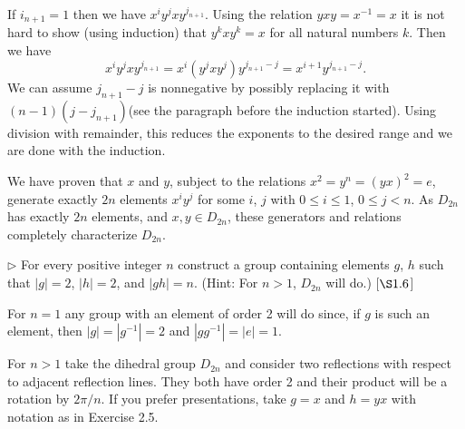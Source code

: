 \begin{solution}
	If $i_{n+1} = 1$ then we have $x^iy^jxy^{j_{n+1}}$. Using the relation $yxy = x^{-1} = x$ it is not hard to show (using induction) that $y^kxy^k = x$ for all natural numbers $k$. Then we have 
	\[
		x^iy^jxy^{j_{n+1}} = x^i(y^jxy^j)y^{j_{n+1} - j} = x^{i+1}y^{j_{n+1} - j}.
	\]
	We can assume $j_{n+1} - j$ is nonnegative by possibly replacing it with $(n-1)(j-j_{n+1})$(see the paragraph before the induction started). Using division with remainder, this reduces the exponents to the desired range and we are done with the induction.
	
	We have proven that $x$ and $y$, subject to the relations $x^2 = y^n= (yx)^2 = e$, generate exactly $2n$ elements $x^iy^j$ for some $i$, $j$ with $0 \leq i \leq 1$, $0\leq j < n$. As $D_{2n}$ has exactly $2n$ elements, and $x,y\in D_{2n}$, these generators and relations completely characterize $D_{2n}$.
\end{solution}

\begin{exercise}
	$\triangleright$ For every positive integer $n$ construct a group containing elements $g$, $h$ such that $|g| = 2$, $|h| = 2$, and $|gh|= n$. (Hint: For $n > 1$, $D_{2n}$ will do.) [$\S 1.6$] 
\end{exercise}
\begin{solution}
	For $n = 1$ any group with an element of order 2 will do since, if $g$ is such an element, then $|g| = |g^{-1}| = 2$ and $|gg^{-1}|= |e| = 1$.
	
	For $n> 1$ take the dihedral group $D_{2n}$ and consider two reflections with respect to adjacent reflection lines. They both have order 2 and their product will be a rotation by $2\pi/n$. If you prefer presentations, take $g = x$ and $h = yx$ with notation as in Exercise 2.5. 
\end{solution}

